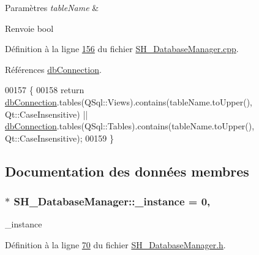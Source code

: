 \begin{DoxyParams}{Paramètres}
{\em table\-Name} & \\
\hline
\end{DoxyParams}
\begin{DoxyReturn}{Renvoie}
bool 
\end{DoxyReturn}


Définition à la ligne \hyperlink{SH__DatabaseManager_8cpp_source_l00156}{156} du fichier \hyperlink{SH__DatabaseManager_8cpp_source}{S\-H\-\_\-\-Database\-Manager.\-cpp}.



Références \hyperlink{classSH__DatabaseManager_a9291f61c3abbba2c4f1567b1d8325f0e}{db\-Connection}.


\begin{DoxyCode}
00157 \{
00158     \textcolor{keywordflow}{return} \hyperlink{classSH__DatabaseManager_a9291f61c3abbba2c4f1567b1d8325f0e}{dbConnection}.tables(QSql::Views).contains(tableName.toUpper(), Qt::CaseInsensitive) 
      || \hyperlink{classSH__DatabaseManager_a9291f61c3abbba2c4f1567b1d8325f0e}{dbConnection}.tables(QSql::Tables).contains(tableName.toUpper(), Qt::CaseInsensitive);
00159 \}
\end{DoxyCode}


\subsection{Documentation des données membres}
\hypertarget{classSH__DatabaseManager_a8ca37d0cafa6a181582d60e045a8d5ab}{
\subsubsection[{\-\_\-instance}]{ $\ast$ S\-H\-\_\-\-Database\-Manager\-::\-\_\-instance = 0\hspace{0.3cm}{\ttfamily [static]}, {\ttfamily [private]}}}\label{classSH__DatabaseManager_a8ca37d0cafa6a181582d60e045a8d5ab}


\-\_\-instance 



Définition à la ligne \hyperlink{SH__DatabaseManager_8h_source_l00070}{70} du fichier \hyperlink{SH__DatabaseManager_8h_source}{S\-H\-\_\-\-Database\-Manager.\-h}.



